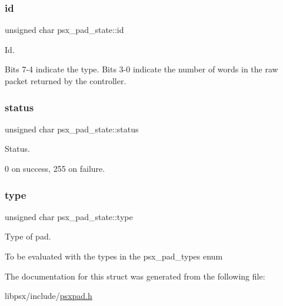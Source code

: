 \subsubsection{\texorpdfstring{id}{id}}
{\footnotesize\ttfamily unsigned char psx\+\_\+pad\+\_\+state\+::id}



Id. 

Bits 7-\/4 indicate the type. Bits 3-\/0 indicate the number of words in the raw packet returned by the controller. \mbox{\label{structpsx__pad__state_ad8b7ccbbce9e28ca834162c302793bf5}} 
\subsubsection{\texorpdfstring{status}{status}}
{\footnotesize\ttfamily unsigned char psx\+\_\+pad\+\_\+state\+::status}



Status. 

0 on success, 255 on failure. \mbox{\label{structpsx__pad__state_a2241e697653b28ca45d2cbad682b7eba}} 
\subsubsection{\texorpdfstring{type}{type}}
{\footnotesize\ttfamily unsigned char psx\+\_\+pad\+\_\+state\+::type}



Type of pad. 

To be evaluated with the types in the psx\+\_\+pad\+\_\+types enum 

The documentation for this struct was generated from the following file\+:\begin{DoxyCompactItemize}
\item 
libpsx/include/\hyperlink{psxpad_8h}{psxpad.\+h}\end{DoxyCompactItemize}
